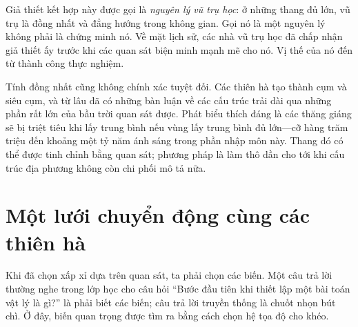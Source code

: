 \begin{classroomqa}
\end{classroomqa}

Giả thiết kết hợp này được gọi là \emph{nguyên lý vũ trụ học}: ở những thang đủ lớn, vũ trụ là đồng nhất và đẳng hướng trong không gian. Gọi nó là một nguyên lý không phải là chứng minh nó. Về mặt lịch sử, các nhà vũ trụ học đã chấp nhận giả thiết ấy trước khi các quan sát biện minh mạnh mẽ cho nó. Vị thế của nó đến từ thành công thực nghiệm.

Tính đồng nhất cũng không chính xác tuyệt đối. Các thiên hà tạo thành cụm và siêu cụm, và từ lâu đã có những bàn luận về các cấu trúc trải dài qua những phần rất lớn của bầu trời quan sát được. Phát biểu thích đáng là các thăng giáng sẽ bị triệt tiêu khi lấy trung bình nếu vùng lấy trung bình đủ lớn---cỡ hàng trăm triệu đến khoảng một tỷ năm ánh sáng trong phần nhập môn này. Thang đó có thể được tinh chỉnh bằng quan sát; phương pháp là làm thô dần cho tới khi cấu trúc địa phương không còn chi phối mô tả nữa.

\begin{classroomqa}
\end{classroomqa}

\section{Một lưới chuyển động cùng các thiên hà}

Khi đã chọn xấp xỉ dựa trên quan sát, ta phải chọn các biến. Một câu trả lời thường nghe trong lớp học cho câu hỏi “Bước đầu tiên khi thiết lập một bài toán vật lý là gì?” là phải biết các biến; câu trả lời truyền thống là chuốt nhọn bút chì. Ở đây, biến quan trọng được tìm ra bằng cách chọn hệ tọa độ cho khéo.

